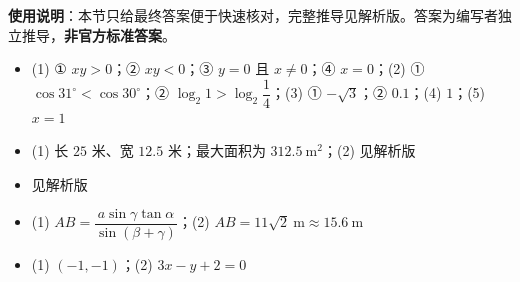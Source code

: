 
\begin{gknotice}
\textbf{使用说明}：本节只给最终答案便于快速核对，完整推导见解析版。答案为编写者独立推导，\textbf{非官方标准答案}。
\end{gknotice}

\begin{itemize}[leftmargin=2.6em]
  \item[\textbf{1.}] (1) ① $xy>0$；② $xy<0$；③ $y=0$ 且 $x\ne0$；④ $x=0$；(2) ① $\cos31^\circ<\cos30^\circ$；② $\log_2 1>\log_2\dfrac14$；(3) ① $-\sqrt3$；② $0.1$；(4) $1$；(5) $x=1$
  \item[\textbf{2.}] (1) 长 $25$ 米、宽 $12.5$ 米；最大面积为 $312.5\ \mathrm{m^2}$；(2) 见解析版
  \item[\textbf{3.}] 见解析版
  \item[\textbf{4.}] (1) $AB=\dfrac{a\sin\gamma\tan\alpha}{\sin(\beta+\gamma)}$；(2) $AB=11\sqrt2\ \mathrm m\approx15.6\ \mathrm m$
  \item[\textbf{5.}] (1) $(-1,-1)$；(2) $3x-y+2=0$
\end{itemize}
